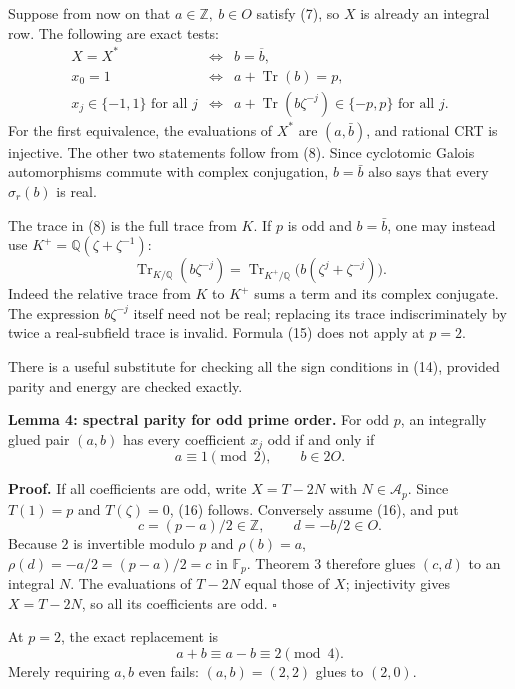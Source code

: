 \documentclass[
  11pt,
]{article}
\begin{document}
Suppose from now on that \(a\in\mathbb Z,\ b\in O\) satisfy (7), so
\(X\) is already an integral row. The following are exact tests: \[
 \begin{array}{rcl}
 X=X^* &\Longleftrightarrow& b=\overline b,\\[2mm]
 x_0=1&\Longleftrightarrow&a+\operatorname{Tr}(b)=p,\\[2mm]
 x_j\in\{-1,1\}\text{ for all }j
 &\Longleftrightarrow&
 a+\operatorname{Tr}(b\zeta^{-j})\in\{-p,p\}
       \text{ for all }j.                                \tag{14}
 \end{array}
\] For the first equivalence, the evaluations of \(X^*\) are
\((a,\bar b)\), and rational CRT is injective. The other two statements
follow from (8). Since cyclotomic Galois automorphisms commute with
complex conjugation, \(b=\bar b\) also says that every \(\sigma_r(b)\)
is real.

The trace in (8) is the full trace from \(K\). If \(p\) is odd and
\(b=\bar b\), one may instead use \(K^+=\mathbb Q(\zeta+\zeta^{-1})\):
\[
 \operatorname{Tr}_{K/\mathbb Q}(b\zeta^{-j})
 =\operatorname{Tr}_{K^+/\mathbb Q}
       \bigl(b(\zeta^j+\zeta^{-j})\bigr).                  \tag{15}
\] Indeed the relative trace from \(K\) to \(K^+\) sums a term and its
complex conjugate. The expression \(b\zeta^{-j}\) itself need not be
real; replacing its trace indiscriminately by twice a real-subfield
trace is invalid. Formula (15) does not apply at \(p=2\).

There is a useful substitute for checking all the sign conditions in
(14), provided parity and energy are checked exactly.

\textbf{Lemma 4: spectral parity for odd prime order.} For odd \(p\), an
integrally glued pair \((a,b)\) has every coefficient \(x_j\) odd if and
only if \[
                 a\equiv1\pmod2,\qquad b\in2O.            \tag{16}
\]

\textbf{Proof.} If all coefficients are odd, write \(X=T-2N\) with
\(N\in\mathcal A_p\). Since \(T(1)=p\) and \(T(\zeta)=0\), (16) follows.
Conversely assume (16), and put \[
 c=(p-a)/2\in\mathbb Z,\qquad d=-b/2\in O.
 \] Because \(2\) is invertible modulo \(p\) and \(\rho(b)=a\),
\(\rho(d)=-a/2=(p-a)/2=c\) in \(\mathbb F_p\). Theorem 3 therefore glues
\((c,d)\) to an integral \(N\). The evaluations of \(T-2N\) equal those
of \(X\); injectivity gives \(X=T-2N\), so all its coefficients are odd.
\(\square\)

At \(p=2\), the exact replacement is \[
 a+b\equiv a-b\equiv2\pmod4.                              \tag{17}
\] Merely requiring \(a,b\) even fails: \((a,b)=(2,2)\) glues to
\((2,0)\).
\end{document}
